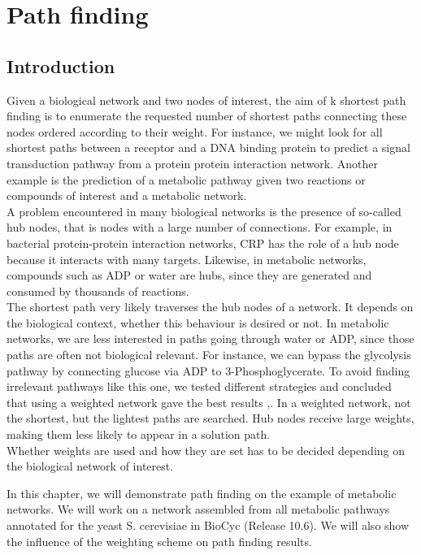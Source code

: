 \chapter{Path finding}

\section{Introduction}
Given a biological network and two nodes of interest, the aim of k shortest path finding is
to enumerate the requested number of shortest paths connecting these nodes ordered according to their weight.
For instance, we might look for all shortest paths between a receptor and a DNA binding protein to predict a signal
transduction pathway from a protein protein interaction network. Another example is the prediction of a metabolic pathway
given two reactions or compounds of interest and a metabolic network.\\
A problem encountered in many biological networks is the presence of so-called hub nodes, that is nodes with
a large number of connections. For example, in bacterial protein-protein interaction networks,
CRP has the role of a hub node because it interacts with many targets. Likewise,
in metabolic networks, compounds such as ADP or water are hubs, since they are generated and consumed by thousands of
reactions.\\
The shortest path very likely traverses the hub nodes of a network. It depends on the biological context, whether this
behaviour is desired or not. In metabolic networks, we are less interested in paths going through water or ADP, since
those paths are often not biological relevant. For instance, we can bypass the glycolysis pathway by connecting glucose
via ADP to 3-Phosphoglycerate. To avoid finding irrelevant pathways like this one,
we tested different strategies and concluded that using a weighted network gave the best results \cite{croes05},\cite{croes06}.
In a weighted network, not the shortest, but the lightest paths are searched. Hub nodes receive large weights, making them
less likely to appear in a solution path.\\
Whether weights are used and how they are set has to be decided depending on the biological network of interest.

In this chapter, we will demonstrate path finding on the example of metabolic networks. We will work on a network assembled
from all metabolic pathways annotated for the yeast S. cerevisiae in BioCyc (Release 10.6). We will also show
the influence of the weighting scheme on path finding results.

